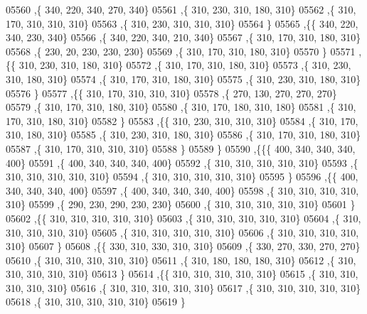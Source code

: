 \begin{DoxyCode}
05560     ,\{   340,   220,   340,   270,   340\}
05561     ,\{   310,   230,   310,   180,   310\}
05562     ,\{   310,   170,   310,   310,   310\}
05563     ,\{   310,   230,   310,   310,   310\}
05564     \}
05565    ,\{\{   340,   220,   340,   230,   340\}
05566     ,\{   340,   220,   340,   210,   340\}
05567     ,\{   310,   170,   310,   180,   310\}
05568     ,\{   230,    20,   230,   230,   230\}
05569     ,\{   310,   170,   310,   180,   310\}
05570     \}
05571    ,\{\{   310,   230,   310,   180,   310\}
05572     ,\{   310,   170,   310,   180,   310\}
05573     ,\{   310,   230,   310,   180,   310\}
05574     ,\{   310,   170,   310,   180,   310\}
05575     ,\{   310,   230,   310,   180,   310\}
05576     \}
05577    ,\{\{   310,   170,   310,   310,   310\}
05578     ,\{   270,   130,   270,   270,   270\}
05579     ,\{   310,   170,   310,   180,   310\}
05580     ,\{   310,   170,   180,   310,   180\}
05581     ,\{   310,   170,   310,   180,   310\}
05582     \}
05583    ,\{\{   310,   230,   310,   310,   310\}
05584     ,\{   310,   170,   310,   180,   310\}
05585     ,\{   310,   230,   310,   180,   310\}
05586     ,\{   310,   170,   310,   180,   310\}
05587     ,\{   310,   170,   310,   310,   310\}
05588     \}
05589    \}
05590   ,\{\{\{   400,   340,   340,   340,   400\}
05591     ,\{   400,   340,   340,   340,   400\}
05592     ,\{   310,   310,   310,   310,   310\}
05593     ,\{   310,   310,   310,   310,   310\}
05594     ,\{   310,   310,   310,   310,   310\}
05595     \}
05596    ,\{\{   400,   340,   340,   340,   400\}
05597     ,\{   400,   340,   340,   340,   400\}
05598     ,\{   310,   310,   310,   310,   310\}
05599     ,\{   290,   230,   290,   230,   230\}
05600     ,\{   310,   310,   310,   310,   310\}
05601     \}
05602    ,\{\{   310,   310,   310,   310,   310\}
05603     ,\{   310,   310,   310,   310,   310\}
05604     ,\{   310,   310,   310,   310,   310\}
05605     ,\{   310,   310,   310,   310,   310\}
05606     ,\{   310,   310,   310,   310,   310\}
05607     \}
05608    ,\{\{   330,   310,   330,   310,   310\}
05609     ,\{   330,   270,   330,   270,   270\}
05610     ,\{   310,   310,   310,   310,   310\}
05611     ,\{   310,   180,   180,   180,   310\}
05612     ,\{   310,   310,   310,   310,   310\}
05613     \}
05614    ,\{\{   310,   310,   310,   310,   310\}
05615     ,\{   310,   310,   310,   310,   310\}
05616     ,\{   310,   310,   310,   310,   310\}
05617     ,\{   310,   310,   310,   310,   310\}
05618     ,\{   310,   310,   310,   310,   310\}
05619     \}

\end{DoxyCode}
